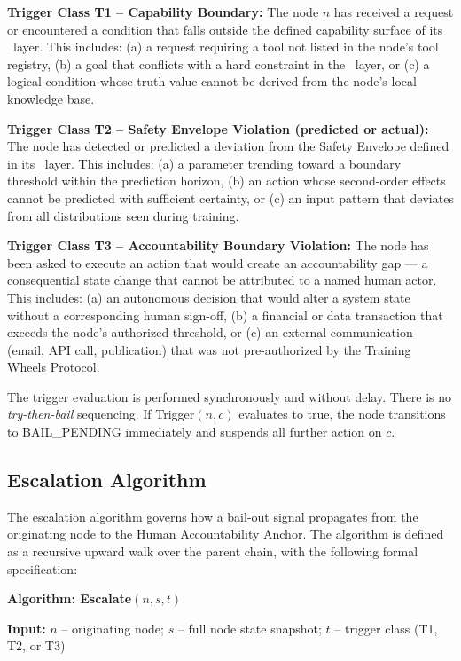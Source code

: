 \bigskip
\noindent\textbf{Trigger Class T1 -- Capability Boundary:} The node $n$ has received a request or encountered a condition that falls outside the defined capability surface of its \purpose\ layer. This includes: (a) a request requiring a tool not listed in the node's tool registry, (b) a goal that conflicts with a hard constraint in the \bounds\ layer, or (c) a logical condition whose truth value cannot be derived from the node's local knowledge base.

\medskip
\noindent\textbf{Trigger Class T2 -- Safety Envelope Violation (predicted or actual):} The node has detected or predicted a deviation from the Safety Envelope defined in its \bounds\ layer. This includes: (a) a parameter trending toward a boundary threshold within the prediction horizon, (b) an action whose second-order effects cannot be predicted with sufficient certainty, or (c) an input pattern that deviates from all distributions seen during training.

\medskip
\noindent\textbf{Trigger Class T3 -- Accountability Boundary Violation:} The node has been asked to execute an action that would create an accountability gap --- a consequential state change that cannot be attributed to a named human actor. This includes: (a) an autonomous decision that would alter a system state without a corresponding human sign-off, (b) a financial or data transaction that exceeds the node's authorized threshold, or (c) an external communication (email, API call, publication) that was not pre-authorized by the Training Wheels Protocol.

\medskip
\noindent The trigger evaluation is performed synchronously and without delay. There is no \emph{try-then-bail} sequencing. If Trigger$(n, c)$ evaluates to true, the node transitions to BAIL\_PENDING immediately and suspends all further action on $c$.

\subsection{Escalation Algorithm}

The escalation algorithm governs how a bail-out signal propagates from the originating node to the Human Accountability Anchor. The algorithm is defined as a recursive upward walk over the parent chain, with the following formal specification:

\bigskip
\noindent\textbf{Algorithm: Escalate$(n, s, t)$}

\medskip
\noindent\textbf{Input:} $n$ -- originating node; $s$ -- full node state snapshot; $t$ -- trigger class (T1, T2, or T3)

